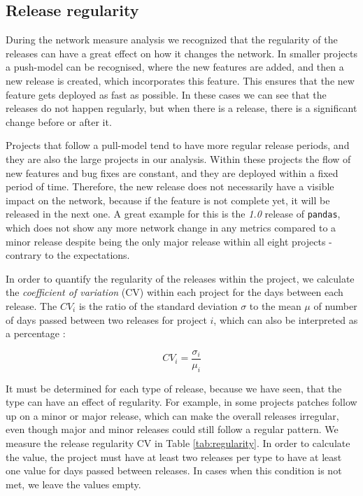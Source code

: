 \subsection{Release regularity}
\label{sec:release_reg}

During the network measure analysis we recognized that the regularity of the releases can have a great effect on how it changes the network. In smaller projects a push-model can be recognised, where the new features are added, and then a new release is created, which incorporates this feature. This ensures that the new feature gets deployed as fast as possible. In these cases we can see that the releases do not happen regularly, but when there is a release, there is a significant change before or after it.

Projects that follow a pull-model tend to have more regular release periods, and they are also the large projects in our analysis. Within these projects the flow of new features and bug fixes are constant, and they are deployed within a fixed period of time. Therefore, the new release does not necessarily have a visible impact on the network, because if the feature is not complete yet, it will be released in the next one. A great example for this is the \textit{1.0} release of \texttt{pandas}, which does not show any more network change in any metrics compared to a minor release despite being the only major release within all eight projects - contrary to the expectations.

In order to quantify the regularity of the releases within the project, we calculate the \textit{coefficient of variation} (CV) within each project for the days between each release. The $CV_i$ is the ratio of the standard deviation $\sigma$ to the mean $\mu$ of number of days passed between two releases for project $i$, which can also be interpreted as a percentage \cite{everittCambridgeDictionaryStatistics1998a}:

\[ CV_i = \frac{\sigma_i}{\mu_i} \]

It must be determined for each type of release, because we have seen, that the type can have an effect of regularity. For example, in some projects patches follow up on a minor or major release, which can make the overall releases irregular, even though major and minor releases could still follow a regular pattern. We measure the release regularity CV in Table \ref{tab:regularity}. In order to calculate the value, the project must have at least two releases per type to have at least one value for days passed between releases. In cases when this condition is not met, we leave the values empty.

